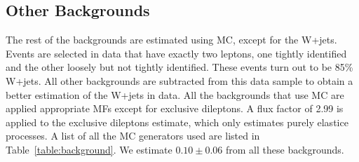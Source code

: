 \subsection{Other Backgrounds}
\par The rest of the backgrounds are estimated using MC, except for the W+jets. Events are selected in data 
that have exactly two leptons, one tightly identified and the other loosely but not tightly identified. These 
events turn out to be 85\% W+jets. All other backgrounds are subtracted from this data sample to obtain a better 
estimation of the W+jets in data. All the backgrounds that use MC are applied appropriate MFs except for exclusive 
dileptons. A flux factor of 2.99 is applied to the exclusive dileptons estimate, which only estimates purely 
elastice processes. A list of all the MC generators used are listed in Table~\ref{table:background}. 
We estimate $0.10\pm0.06$ from all these backgrounds.
